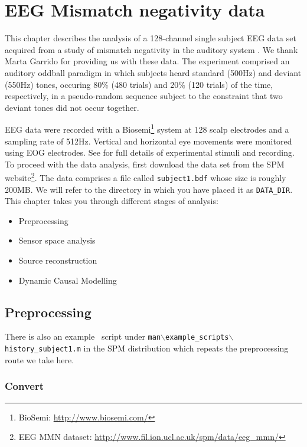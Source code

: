 \chapter{EEG Mismatch negativity data\label{Chap:data:mmn}}

This chapter describes the analysis of a 128-channel single subject EEG data set acquired from a study of mismatch negativity in the auditory system \cite{marta_mmndcm}. We thank Marta Garrido for providing us with these data. The experiment comprised an auditory oddball paradigm in which subjects heard standard (500Hz) and deviant (550Hz) tones, occuring 80\% (480 trials) and 20\% (120 trials) of the time, respectively, in a pseudo-random sequence subject to the constraint that two deviant tones did not occur together.

EEG data were recorded with a Biosemi\footnote{BioSemi: \url{http://www.biosemi.com/}} system at 128 scalp electrodes and a sampling rate of 512Hz. Vertical and horizontal eye movements were monitored using EOG electrodes. See \cite{marta_mmndcm} for full details of experimental stimuli and recording. To proceed with the data analysis, first download the  data set from the SPM website\footnote{EEG MMN dataset: \url{http://www.fil.ion.ucl.ac.uk/spm/data/eeg\_mmn/}}. The data comprises a file called \texttt{subject1.bdf} whose size is roughly 200MB. We will refer to the directory in which you have placed it as \texttt{DATA\_DIR}. This chapter takes you through different stages of analysis:

\begin{itemize}
\item{Preprocessing}
\item{Sensor space analysis}
\item{Source reconstruction}
\item{Dynamic Causal Modelling}
\end{itemize}

\section{Preprocessing}

There is also an example \matlab\ script under \texttt{man$\backslash$example\_scripts$\backslash$history\_subject1.m} in the SPM distribution which repeats the preprocessing route we take here.

\subsection{Convert}

